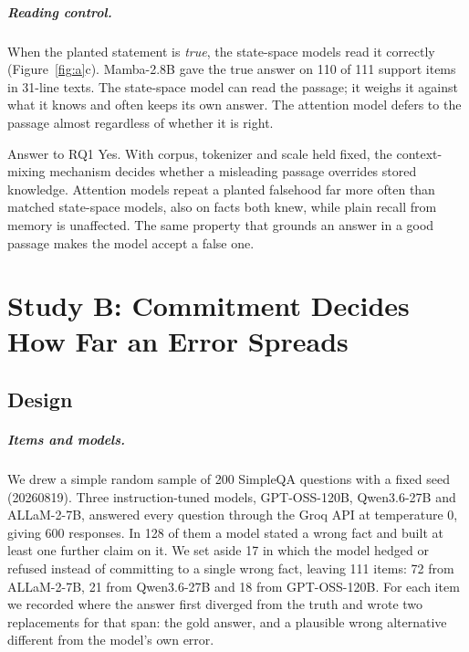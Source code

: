 \documentclass[11pt,a4paper,oneside]{report}
\begin{document}
\paragraph{Reading control.} When the planted statement is \emph{true}, the state-space models read it correctly (Figure~\ref{fig:a}c). Mamba-2.8B gave the true answer on 110 of 111 support items in 31-line texts. The state-space model can read the passage; it weighs it against what it knows and often keeps its own answer. The attention model defers to the passage almost regardless of whether it is right.

\begin{finding}{Answer to RQ1}
Yes. With corpus, tokenizer and scale held fixed, the context-mixing mechanism decides whether a misleading passage overrides stored knowledge. Attention models repeat a planted falsehood far more often than matched state-space models, also on facts both knew, while plain recall from memory is unaffected. The same property that grounds an answer in a good passage makes the model accept a false one.
\end{finding}

\chapter{Study B: Commitment Decides How Far an Error Spreads}
\label{ch:b}

\section{Design}
\paragraph{Items and models.} We drew a simple random sample of 200 SimpleQA questions with a fixed seed (20260819). Three instruction-tuned models, GPT-OSS-120B, Qwen3.6-27B and ALLaM-2-7B, answered every question through the Groq API at temperature 0, giving 600 responses. In 128 of them a model stated a wrong fact and built at least one further claim on it. We set aside 17 in which the model hedged or refused instead of committing to a single wrong fact, leaving 111 items: 72 from ALLaM-2-7B, 21 from Qwen3.6-27B and 18 from GPT-OSS-120B. For each item we recorded where the answer first diverged from the truth and wrote two replacements for that span: the gold answer, and a plausible wrong alternative different from the model's own error.
\end{document}
